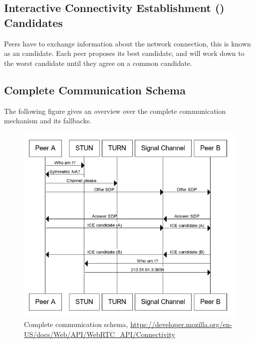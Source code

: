 \subsection{Interactive Connectivity Establishment () Candidates}
Peers have to exchange information about the network connection, this is known as an  candidate. Each peer proposes its best candidate, and will work down to the worst candidate until they agree on a common candidate.

\clearpage
\subsection{Complete Communication Schema}
The following figure gives an overview over the complete communication mechanism and its fallbacks.

\begin{figure}[H]
	\includegraphics[scale=0.5]{images/webrtc-complete-diagram.png}
	\centering
	\caption{ Complete communication schema, \url{https://developer.mozilla.org/en-US/docs/Web/API/WebRTC_API/Connectivity}}
	\label{fig:WebRTC}
\end{figure}
